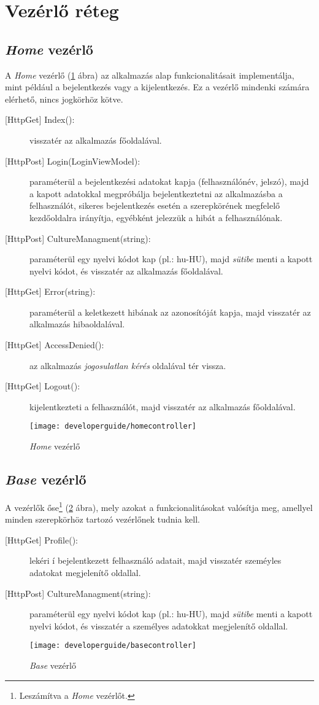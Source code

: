 \section{Vezérlő réteg}
\label{sec:controller}
\subsection{\emph{Home} vezérlő}
A \emph{Home} vezérlő (\ref{fig:homecontroller} ábra) az alkalmazás alap funkcionalitásait implementálja, mint például a bejelentkezés vagy a kijelentkezés. Ez a vezérlő mindenki számára elérhető, nincs jogkörhöz kötve.
\begin{description}
	\item[{[HttpGet]} Index():] visszatér az alkalmazás főoldalával.
	\item[{[HttpPost]} Login(LoginViewModel):] paraméterül a bejelentkezési adatokat kapja (felhasználónév, jelszó), majd a kapott adatokkal megpróbálja bejelentkeztetni az alkalmazásba a felhasználót, sikeres bejelentkezés esetén a szerepkörének megfelelő kezdőoldalra irányítja, egyébként jelezzük a hibát a felhasználónak.
	\item[{[HttpPost]} CultureManagment(string):] paraméterül egy nyelvi kódot kap (pl.: hu-HU), majd \emph{sütibe} menti a kapott nyelvi kódot, és visszatér az alkalmazás főoldalával. 
	\item[{[HttpGet]} Error(string):] paraméterül a keletkezett hibának az azonosítóját kapja, majd visszatér az alkalmazás hibaoldalával.
	\item[{[HttpGet]} AccessDenied():] az alkalmazás \emph{jogosulatlan kérés} oldalával tér vissza.
	\item[{[HttpGet]} Logout():] kijelentkezteti a felhasználót, majd visszatér az alkalmazás főoldalával.
\end{description}
\begin{figure}[H]
	\centering
	\texttt{[image: developerguide/homecontroller]}
	\caption{\emph{Home} vezérlő}
	\label{fig:homecontroller}
\end{figure}
\subsection{\emph{Base} vezérlő}
A vezérlők őse\footnote{Leszámítva a \emph{Home} vezérlőt.} (\ref{fig:basecontroller} ábra), mely azokat a funkcionalitásokat valósítja meg, amellyel minden szerepkörhöz tartozó vezérlőnek tudnia kell.
\begin{description}
	\item[{[HttpGet]} Profile():] lekéri í bejelentkezett felhasználó adatait, majd visszatér szeméyles adatokat megjelenítő oldallal.
	\item[{[HttpPost]} CultureManagment(string):] paraméterül egy nyelvi kódot kap (pl.: hu-HU), majd \emph{sütibe} menti a kapott nyelvi kódot, és visszatér a személyes adatokkat megjelenítő oldallal. 
\end{description}
\begin{figure}[H]
	\centering
	\texttt{[image: developerguide/basecontroller]}
	\caption{\emph{Base} vezérlő}
	\label{fig:basecontroller}
\end{figure}
